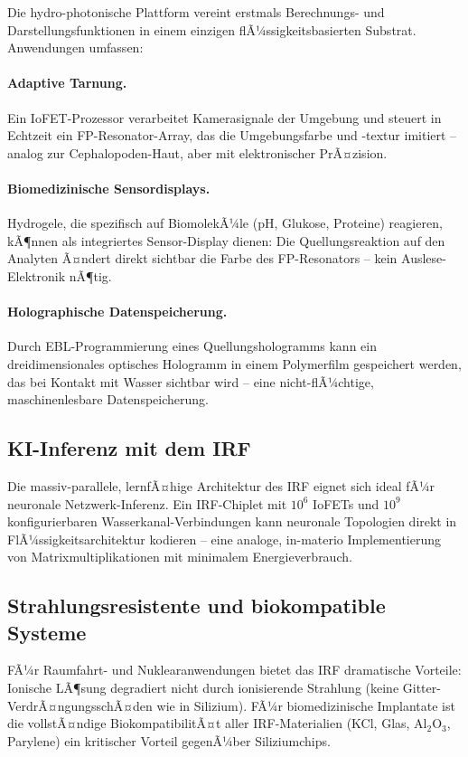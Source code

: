 ﻿\documentclass[a4paper,12pt]{scrreprt}
\theoremstyle{definition}
\begin{document}
Die hydro-photonische Plattform vereint erstmals Berechnungs- und
Darstellungsfunktionen in einem einzigen flÃ¼ssigkeitsbasierten Substrat.
Anwendungen umfassen:

\paragraph{Adaptive Tarnung.}
Ein IoFET-Prozessor verarbeitet Kamerasignale der Umgebung und steuert
in Echtzeit ein FP-Resonator-Array, das die Umgebungsfarbe und -textur
imitiert -- analog zur Cephalopoden-Haut, aber mit elektronischer PrÃ¤zision.

\paragraph{Biomedizinische Sensordisplays.}
Hydrogele, die spezifisch auf BiomolekÃ¼le (pH, Glukose, Proteine) reagieren,
kÃ¶nnen als integriertes Sensor-Display dienen: Die Quellungsreaktion auf
den Analyten Ã¤ndert direkt sichtbar die Farbe des FP-Resonators --
kein Auslese-Elektronik nÃ¶tig.

\paragraph{Holographische Datenspeicherung.}
Durch EBL-Programmierung eines Quellungshologramms kann ein dreidimensionales
optisches Hologramm in einem Polymerfilm gespeichert werden, das bei
Kontakt mit Wasser sichtbar wird -- eine nicht-flÃ¼chtige, maschinenlesbare
Datenspeicherung.

\subsection{KI-Inferenz mit dem IRF}

Die massiv-parallele, lernfÃ¤hige Architektur des IRF eignet sich ideal fÃ¼r
neuronale Netzwerk-Inferenz. Ein IRF-Chiplet mit $10^6$ IoFETs und
$10^9$ konfigurierbaren Wasserkanal-Verbindungen kann neuronale Topologien
direkt in FlÃ¼ssigkeitsarchitektur kodieren -- eine analoge, in-materio
Implementierung von Matrixmultiplikationen mit minimalem Energieverbrauch.

\subsection{Strahlungsresistente und biokompatible Systeme}

FÃ¼r Raumfahrt- und Nuklearanwendungen bietet das IRF dramatische Vorteile:
Ionische LÃ¶sung degradiert nicht durch ionisierende Strahlung (keine
Gitter-VerdrÃ¤ngungsschÃ¤den wie in Silizium). FÃ¼r biomedizinische Implantate
ist die vollstÃ¤ndige BiokompatibilitÃ¤t aller IRF-Materialien (KCl, Glas,
Al$_2$O$_3$, Parylene) ein kritischer Vorteil gegenÃ¼ber Siliziumchips.
\end{document}
